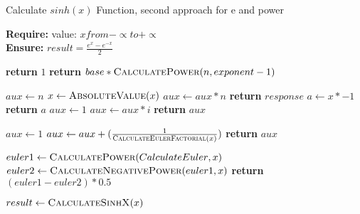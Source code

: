 \documentclass[12pt]{article}
\begin{document}
\begin{algorithm}

\caption{Calculate $sinh(x)$ Function, second approach for e and power}

\textbf{Require:}  value: $x from -\propto to + \propto$  \\
\textbf{Ensure:} $result = \frac{e^x- e^{-x}}{2}$
\begin{algorithmic}[1]

    \State \textbf{return} $1$
    \EndIf
    \State \textbf{return} $base*\Call{CalculatePower}{n,exponent-1}$
    \EndProcedure
\Statex

    \State $aux \leftarrow n$
    \State $x \leftarrow  \Call{AbsoluteValue}{x} $
    \State $aux \leftarrow aux * n$
    \EndFor
    \State \textbf{return} $response$
    \EndProcedure
\Statex
{}
    \State $a \leftarrow x*-1$
    \State \textbf{return} $a$
    \EndProcedure
\Statex
{}
    \State $aux \leftarrow 1$
    \State $aux \leftarrow aux * i$
    \EndFor
    \State \textbf{return} $aux$
    \EndProcedure
\Statex

    \State $aux \leftarrow 1$
    \State $aux \leftarrow aux+(\frac{1}{\Call{CalculateEulerFactorial}{x}})$
    \EndFor
    \State \textbf{return} $aux$
    \EndProcedure
\Statex

   \State $euler1 \leftarrow \Call{CalculatePower}{CalculateEuler{ },x} $ 
   \State $euler2 \leftarrow \Call{CalculateNegativePower}{euler1,x} $
    \State \textbf{return} $(euler1-euler2)*0.5${}
    \EndProcedure
\Statex



\State $ result \leftarrow \Call{CalculateSinhX}{x}$
\end{algorithmic}
\end{algorithm}
\end{document}
